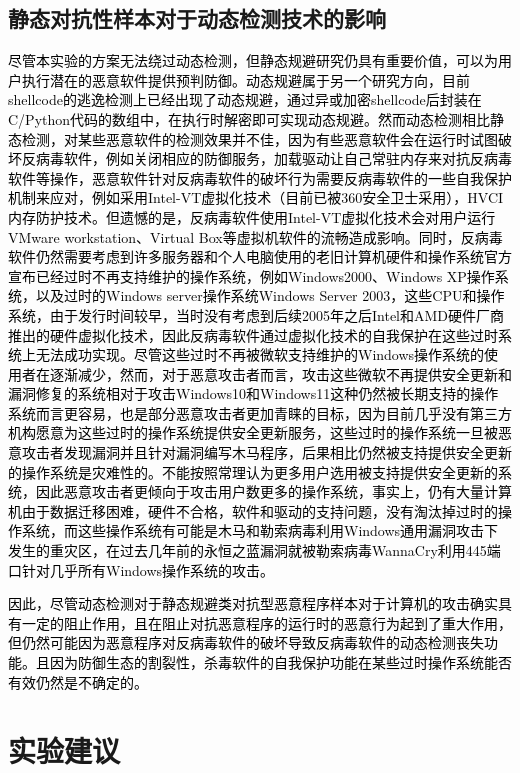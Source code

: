 \subsection{静态对抗性样本对于动态检测技术的影响}

\textcolor{black}{尽管本实验的方案无法绕过动态检测，但静态规避研究仍具有重要价值，可以为用户执行潜在的恶意软件提供预判防御。动态规避属于另一个研究方向，目前shellcode的逃逸检测上已经出现了动态规避，通过异或加密shellcode后封装在C/Python代码的数组中，在执行时解密即可实现动态规避。然而动态检测相比静态检测，对某些恶意软件的检测效果并不佳，因为有些恶意软件会在运行时试图破坏反病毒软件，例如关闭相应的防御服务，加载驱动让自己常驻内存来对抗反病毒软件等操作，恶意软件针对反病毒软件的破坏行为需要反病毒软件的一些自我保护机制来应对，例如采用Intel-VT虚拟化技术（目前已被360安全卫士采用），HVCI内存防护技术。但遗憾的是，反病毒软件使用Intel-VT虚拟化技术会对用户运行VMware workstation、Virtual Box等虚拟机软件的流畅造成影响。同时，反病毒软件仍然需要考虑到许多服务器和个人电脑使用的老旧计算机硬件和操作系统官方宣布已经过时不再支持维护的操作系统，例如Windows2000、Windows XP操作系统，以及过时的Windows server操作系统Windows Server 2003，这些CPU和操作系统，由于发行时间较早，当时没有考虑到后续2005年之后Intel和AMD硬件厂商推出的硬件虚拟化技术，因此反病毒软件通过虚拟化技术的自我保护在这些过时系统上无法成功实现。尽管这些过时不再被微软支持维护的Windows操作系统的使用者在逐渐减少，然而，对于恶意攻击者而言，攻击这些微软不再提供安全更新和漏洞修复的系统相对于攻击Windows10和Windows11这种仍然被长期支持的操作系统而言更容易，也是部分恶意攻击者更加青睐的目标，因为目前几乎没有第三方机构愿意为这些过时的操作系统提供安全更新服务，这些过时的操作系统一旦被恶意攻击者发现漏洞并且针对漏洞编写木马程序，后果相比仍然被支持提供安全更新的操作系统是灾难性的。不能按照常理认为更多用户选用被支持提供安全更新的系统，因此恶意攻击者更倾向于攻击用户数更多的操作系统，事实上，仍有大量计算机由于数据迁移困难，硬件不合格，软件和驱动的支持问题，没有淘汰掉过时的操作系统，而这些操作系统有可能是木马和勒索病毒利用Windows通用漏洞攻击下发生的重灾区，在过去几年前的永恒之蓝漏洞就被勒索病毒WannaCry利用445端口针对几乎所有Windows操作系统的攻击。}

\textcolor{black}{因此，尽管动态检测对于静态规避类对抗型恶意程序样本对于计算机的攻击确实具有一定的阻止作用，且在阻止对抗恶意程序的运行时的恶意行为起到了重大作用，但仍然可能因为恶意程序对反病毒软件的破坏导致反病毒软件的动态检测丧失功能。且因为防御生态的割裂性，杀毒软件的自我保护功能在某些过时操作系统能否有效仍然是不确定的。}

\section{实验建议}

